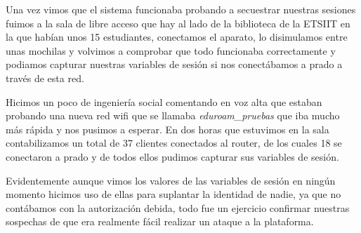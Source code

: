 Una vez vimos que el sistema funcionaba probando a secuestrar nuestras sesiones fuimos a la sala de libre acceso que hay al lado de la biblioteca de la ETSIIT en la que habían unos 15 estudiantes, conectamos el aparato, lo disimulamos entre unas mochilas y volvimos a comprobar que todo funcionaba correctamente y podiamos capturar nuestras variables de sesión si nos conectábamos a prado a través de esta red. 

Hicimos un poco de ingeniería social comentando en voz alta que estaban probando una nueva red wifi que se llamaba \textit{eduroam\_pruebas} que iba mucho más rápida y nos pusimos a esperar. En dos horas que estuvimos en la sala contabilizamos un total de 37 clientes conectados al router, de los cuales 18 se conectaron a prado y de todos ellos pudimos capturar sus variables de sesión. 

Evidentemente aunque vimos los valores de las variables de sesión en ningún momento hicimos uso de ellas para suplantar la identidad de nadie, ya que no contábamos con la autorización debida, todo fue un ejercicio confirmar nuestras sospechas de que era realmente fácil realizar un ataque a la plataforma.




